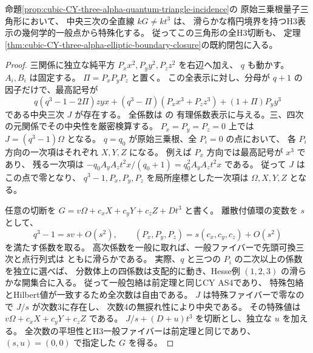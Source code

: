 \begin{theorem}[原始三乗根の量子三角形からの全切断の特殊化]
\label{thm:cubic-CY-three-alpha-root-three-closure}
命題\ref{prop:cubic-CY-three-alpha-quantum-triangle-incidence}の
原始三乗根量子三角形において、
中央三次の全直線 $kG\ne kt^3$ は、
滑らかな楕円境界を持つH3表示の幾何学的一般点から特殊化する。
従ってこの三角形の全H3切断も、
定理\ref{thm:cubic-CY-three-alpha-elliptic-boundary-closure}の既約閉包に入る。
\end{theorem}
\begin{proof}
三関係に独立な純平方 $P_xx^2,P_yy^2,P_zz^2$ を右辺へ加え、
$q$ も動かす。$A_i,B_i$ は固定する。
$\Pi=P_xP_yP_z$ と置く。
この全表示に対し、分母が $q+1$ の因子だけで、最高記号が
\[
 q(q^3-1-2\Pi)zyx
 +(q^3-\Pi)(P_xx^3+P_zz^3)+(1+\Pi)P_yy^3
\]
である中央三次 $J$ が存在する。
全係数は
 の
有理係数表示に与える。三、四次の元関係でその中央性を厳密検算する。
$P_x=P_y=P_z=0$ 上では $J=(q^3-1)\Omega$ となる。
$q=q_0$ が原始三乗根、全 $P_i=0$ の点において、
各 $P_i$ 方向の一次項はそれぞれ $X,Y,Z$ になる。
例えば $P_x$ 方向では最高記号が $x^3$ であり、
残る一次項は $-q_0 A_y A_z t^2x/(q_0+1)=q_0^2 A_y A_z t^2x$ である。
従って $J$ はこの点で零となり、
$q^3-1,P_x,P_y,P_z$ を局所座標とした一次項は $\Omega,X,Y,Z$ となる。

任意の切断を $G=v\Omega+c_xX+c_yY+c_zZ+Dt^3$ と書く。
離散付値環の変数を $s$ として、
\[
 q^3-1=sv+O(s^2),\qquad
 (P_x,P_y,P_z)=s(c_x,c_y,c_z)+O(s^2)
\]
を満たす係数を取る。
高次係数を一般に取れば、一般ファイバーで先頭可換三次と点行列式は
ともに滑らかである。
実際、$q$ と三つの $P_i$ の二次以上の係数を独立に選べば、
分数体上の四係数は支配的に動き、Hesse例 $(1,2,3)$ の滑らかな開集合に入る。
従って一般包絡は前定理と同じCY AS4であり、
特殊包絡とHilbert値が一致するため全次数は自由である。
$J$ は特殊ファイバーで零なので $J/s$ が次数3に存在し、
次数4の無捩れ性により中央である。
その特殊値は $v\Omega+c_xX+c_yY+c_zZ$ である。
$J/s+(D+u)t^3$ を切断とし、独立な $u$ を加える。
全次数の平坦性とH3一般ファイバーは前定理と同じであり、
$(s,u)=(0,0)$ で指定した $G$ を得る。
\end{proof}

